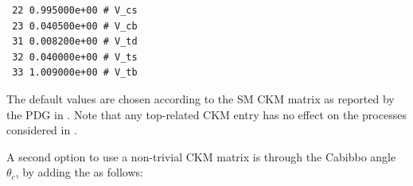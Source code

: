 \documentclass[english,11pt]{article}
\begin{document}
{\begin{lstlisting}
 22 0.995000e+00 # V_cs                                                                                                                                                                                                                                                                    
 23 0.040500e+00 # V_cb                                                                                                                                                                                                                                                                    
 31 0.008200e+00 # V_td                                                                                                                                                                                                                                                                    
 32 0.040000e+00 # V_ts                                                                                                                                                                                                                                                                    
 33 1.009000e+00 # V_tb                                                                                                                                                                                                                                                                    
\end{lstlisting}
}

The default values are chosen according to the SM CKM matrix as reported by the PDG in . Note that any 
top-related CKM entry has no effect on the processes considered in \Matrix{}.

A second option to use a non-trivial CKM matrix is through the Cabibbo angle $\theta_c$, by adding the  as follows:
\end{document}
